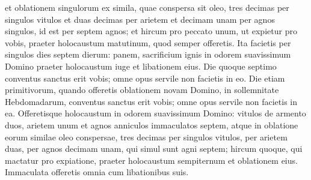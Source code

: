 \begin{biblechapter}
\begin{biblechapter}
\begin{biblechapter}
\begin{biblechapter}
\begin{biblechapter}
\begin{biblechapter}
\begin{biblechapter}
\begin{biblechapter}
\begin{biblechapter}
\begin{biblechapter}
\begin{biblechapter}
\begin{biblechapter}
\begin{biblechapter}
\begin{biblechapter}
\begin{biblechapter}
\begin{biblechapter}
\begin{biblechapter}
\begin{biblechapter}
\begin{biblechapter}
\begin{biblechapter}
\begin{biblechapter}
\begin{biblechapter}
\begin{biblechapter}
\begin{biblechapter}
\begin{biblechapter}
\begin{biblechapter}
\begin{biblechapter}
\begin{biblechapter}
\verse et oblationem singulorum ex simila, quae conspersa sit oleo, tres decimas per singulos vitulos et duas decimas per arietem 
\verse et decimam unam per agnos singulos, id est per septem agnos; 
\verse et hircum pro peccato unum, ut expietur pro vobis, 
 \verse praeter holocaustum matutinum, quod semper offeretis. 
\verse Ita facietis per singulos dies septem dierum: panem, sacrificium ignis in odorem suavissimum Domino praeter holocaustum iuge et libationem eius. 
\verse Die quoque septimo conventus sanctus erit vobis; omne opus servile non facietis in eo.
 \verse Die etiam primitivorum, quando offeretis oblationem novam Domino, in sollemnitate Hebdomadarum, conventus sanctus erit vobis; omne opus servile non facietis in ea. 
\verse Offeretisque holocaustum in odorem suavissimum Domino: vitulos de armento duos, arietem unum et agnos anniculos immaculatos septem, 
 \verse atque in oblatione eorum similae oleo conspersae, tres decimas per singulos vitulos, per arietem duas, 
\verse per agnos decimam unam, qui simul sunt agni septem; 
\verse hircum quoque, qui mactatur pro expiatione, 
\verse praeter holocaustum sempiternum et oblationem eius. Immaculata offeretis omnia cum libationibus suis.
 

\end{biblechapter}
\end{biblechapter}
\end{biblechapter}
\end{biblechapter}
\end{biblechapter}
\end{biblechapter}
\end{biblechapter}
\end{biblechapter}
\end{biblechapter}
\end{biblechapter}
\end{biblechapter}
\end{biblechapter}
\end{biblechapter}
\end{biblechapter}
\end{biblechapter}
\end{biblechapter}
\end{biblechapter}
\end{biblechapter}
\end{biblechapter}
\end{biblechapter}
\end{biblechapter}
\end{biblechapter}
\end{biblechapter}
\end{biblechapter}
\end{biblechapter}
\end{biblechapter}
\end{biblechapter}
\end{biblechapter}
